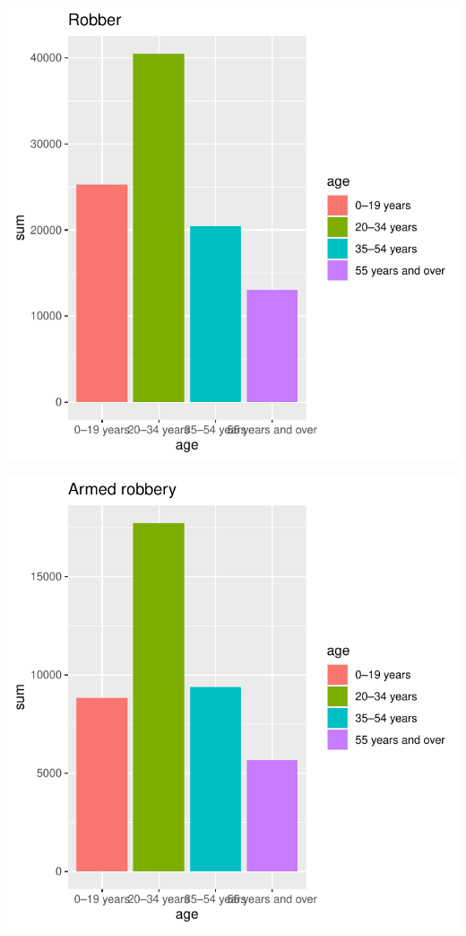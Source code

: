 \documentclass[11pt,a4paper,]{article}
\begin{document}
\includegraphics{report_files/figure-latex/rplot-1.pdf}

\includegraphics{report_files/figure-latex/armplot-1.pdf}
\end{document}
